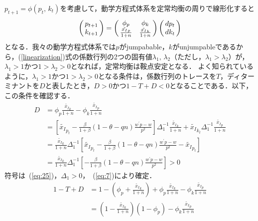 \documentclass[12pt,a4paper]{jsarticle}
\begin{document}
$p_{t+1} =\phi(p_{t}, \, k_{t})$を考慮して，動学方程式体系を定常均衡の周りで線形化すると
\begin{eqnarray}
\left(
\begin{array}{@{\,} c @{\,}}
 p_{t+1} \\
k_{t+1}
\end{array} 
\right) 
=
 \left(
\begin{array}{@{\,} cc @{\,}}
 \phi_{p} &  \phi_{k}  \\
\frac{\tilde{x_{I}}_{p}}{1+n} & \frac{\tilde{x_{I}}_{k}}{1+n} 
\end{array} 
\right)
\left(
\begin{array}{@{\,} c @{\,}}
dp_{t} \\
dk_{t}
\end{array} 
\right)
\label{linearization} 
\end{eqnarray}
となる．我々の動学方程式体系では$p$がjumpabable，$k$がunjumpableであるから，(\ref{linearization})式の係数行列の2つの固有値$\lambda_{1}, \, \lambda_{2}$（ただし，$\lambda_{1}>\lambda_{2}$）が，$\lambda_{1}>1$かつ$1>\lambda_{2}>0$となれば，定常均衡は鞍点安定となる．
よく知られているように，$\lambda_{1}>1$かつ$1>\lambda_{2}>0$となる条件は，係数行列のトレースを$T$，ディターミナントを$D$と表したとき，$D>0$かつ$1-T+D<0$となることである．以下，この条件を確認する．
%
\begin{align}
 D &= \phi_{p}\frac{\tilde{x_{I}}_{k}}{1+n}  -  \phi_{k}\frac{\tilde{x_{I}}_{p}}{1+n} \nonumber \\
&=\left[\tilde{x_{I}}_{p_{t}} - \frac{\beta}{1+\beta}(1-\theta-qn) \frac{w^{\prime}p -w}{p^{2}}    \right] \Delta_{1}^{-1} \frac{\tilde{x_{I}}_{k}}{1+n} +\tilde{x_{I}}_{k_{t}} \Delta_{1}^{-1}\frac{\tilde{x_{I}}_{p}}{1+n} \nonumber \\
&=\frac{\tilde{x_{I}}_{k}}{1+n} \Delta_{1}^{-1} \left[\tilde{x_{I}}_{p_{t}} - \frac{\beta}{1+\beta}(1-\theta-qn) \frac{w^{\prime}p -w}{p^{2}}   - \tilde{x_{I}}_{p_{t}}\right] \nonumber \\
&=\frac{\tilde{x_{I}}_{k}}{1+n} \Delta_{1}^{-1} \left[- \frac{\beta}{1+\beta}(1-\theta-qn) \frac{w^{\prime}p -w}{p^{2}}   \right] >0\label{eq:28}
\end{align}
符号は~(\ref{eq:25})，$\Delta_{1}>0$，~(\ref{eq:7})により確定．
%
\begin{align}
 1 -T + D &= 1- \left( \phi_{p} + \frac{\tilde{x_{I}}_{k}}{1+n} \right)  + \phi_{p}\frac{\tilde{x_{I}}_{k}}{1+n}  -  \phi_{k}\frac{\tilde{x_{I}}_{p}}{1+n} \nonumber \\
&=\left(1 -  \frac{\tilde{x_{I}}_{k}}{1+n} \right) \left(1 - \phi_{p} \right) -  \phi_{k}\frac{\tilde{x_{I}}_{p}}{1+n} \label{eq:21}
\end{align}
\end{document}
